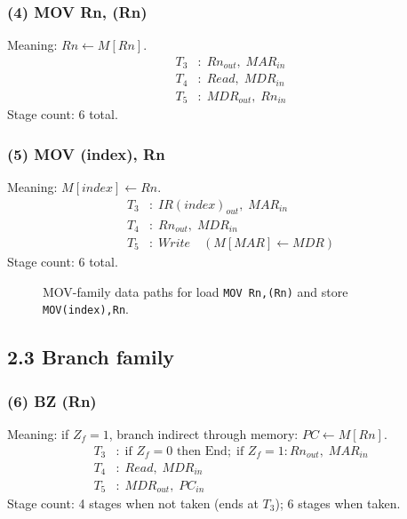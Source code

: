 \documentclass{article}
\begin{document}
\subsubsection*{(4) MOV Rn, (Rn)}
Meaning: \(Rn \leftarrow M[Rn]\).
\begin{align*}
T_3 &: \; Rn_{out},\; MAR_{in} \\
T_4 &: \; Read,\; MDR_{in} \\
T_5 &: \; MDR_{out},\; Rn_{in}
\end{align*}
Stage count: 6 total.

\subsubsection*{(5) MOV (index), Rn}
Meaning: \(M[index] \leftarrow Rn\).
\begin{align*}
T_3 &: \; IR(index)_{out},\; MAR_{in} \\
T_4 &: \; Rn_{out},\; MDR_{in} \\
T_5 &: \; Write\quad (M[MAR] \leftarrow MDR)
\end{align*}
Stage count: 6 total.

\begin{figure}[H]
\centering
{}
\caption{MOV-family data paths for load \texttt{MOV Rn,(Rn)} and store \texttt{MOV(index),Rn}.}
\end{figure}

\subsection*{2.3 Branch family}

\subsubsection*{(6) BZ (Rn)}
Meaning: if \(Z_f=1\), branch indirect through memory: \(PC \leftarrow M[Rn]\).
\begin{align*}
T_3 &: \; \text{if } Z_f=0 \text{ then End};\; \text{if } Z_f=1: Rn_{out},\; MAR_{in} \\
T_4 &: \; Read,\; MDR_{in} \\
T_5 &: \; MDR_{out},\; PC_{in}
\end{align*}
Stage count: 4 stages when not taken (ends at \(T_3\)); 6 stages when taken.
\end{document}
